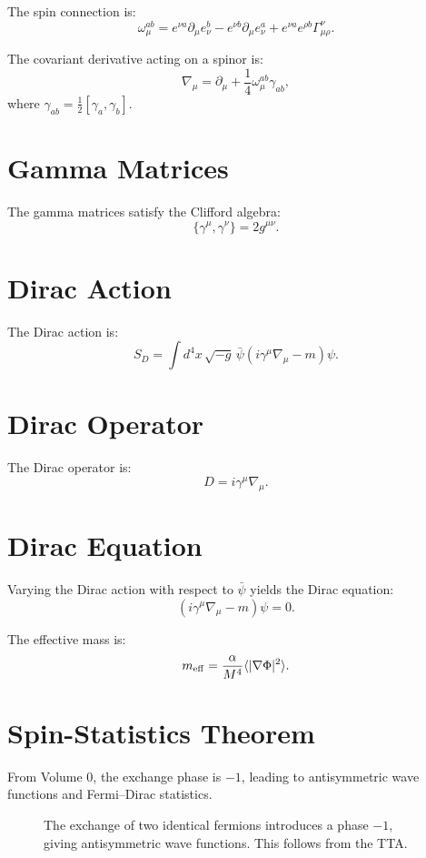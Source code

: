 \documentclass[12pt,oneside]{book}
\begin{document}
The spin connection is:
\[
\omega_\mu^{ab} = e^{\nu a} \partial_\mu e_\nu^b - e^{\nu b} \partial_\mu e_\nu^a + e^{\nu a} e^{\rho b} \Gamma_{\mu\rho}^{\nu}.
\]

The covariant derivative acting on a spinor is:
\[
\nabla_\mu = \partial_\mu + \frac{1}{4} \omega_\mu^{ab} \gamma_{ab},
\]
where $\gamma_{ab} = \frac{1}{2}[\gamma_a, \gamma_b]$.

\section{Gamma Matrices}

The gamma matrices satisfy the Clifford algebra:
\[
\{\gamma^\mu, \gamma^\nu\} = 2g^{\mu\nu}.
\]

\section{Dirac Action}

The Dirac action is:
\[
S_D = \int d^4x \, \sqrt{-g} \, \bar{\psi} \left( i\gamma^\mu \nabla_\mu - m \right) \psi.
\]

\section{Dirac Operator}

The Dirac operator is:
\[
D = i\gamma^\mu \nabla_\mu.
\]

\section{Dirac Equation}

Varying the Dirac action with respect to $\bar{\psi}$ yields the Dirac equation:
\[
(i\gamma^\mu \nabla_\mu - m)\psi = 0.
\]

The effective mass is:
\[
m_{\rm eff} = \frac{\alpha}{M^4} \langle |\nabla\Phi|^2 \rangle.
\]

\section{Spin-Statistics Theorem}

From Volume 0, the exchange phase is $-1$, leading to antisymmetric wave functions and Fermi--Dirac statistics.

\begin{figure}[H]
\centering
{}
\caption{The exchange of two identical fermions introduces a phase $-1$, giving antisymmetric wave functions. This follows from the TTA.}
\label{fig:spin_statistics}
\end{figure}
\end{document}
